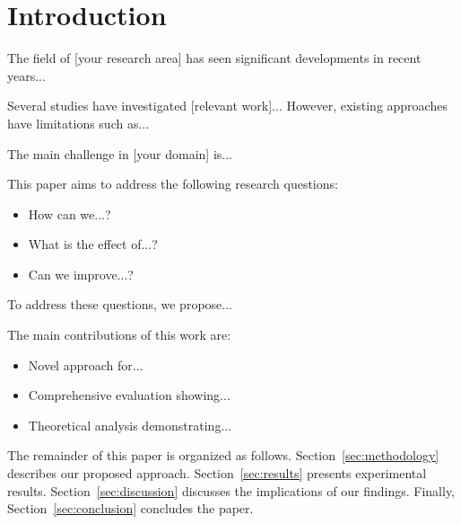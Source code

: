 \section{Introduction}
\label{sec:introduction}


The field of [your research area] has seen significant developments in recent years...

Several studies have investigated [relevant work]... However, existing approaches have limitations such as...

The main challenge in [your domain] is...

This paper aims to address the following research questions:
\begin{itemize}
    \item How can we...?
    \item What is the effect of...?
    \item Can we improve...?
\end{itemize}

To address these questions, we propose...

The main contributions of this work are:
\begin{itemize}
    \item Novel approach for...
    \item Comprehensive evaluation showing...
    \item Theoretical analysis demonstrating...
\end{itemize}

The remainder of this paper is organized as follows. Section~\ref{sec:methodology} describes our proposed approach. Section~\ref{sec:results} presents experimental results. Section~\ref{sec:discussion} discusses the implications of our findings. Finally, Section~\ref{sec:conclusion} concludes the paper.